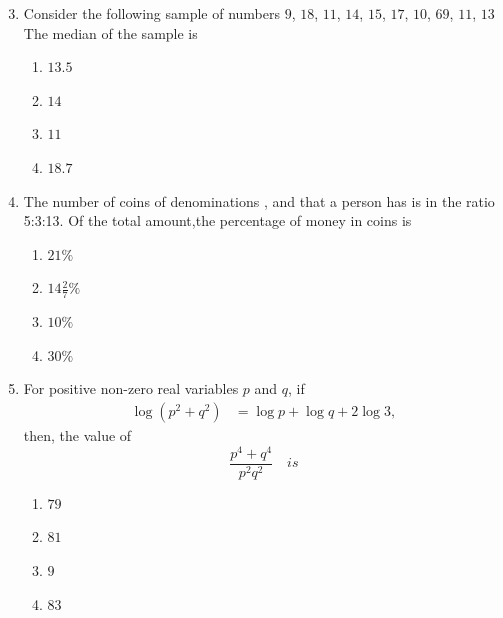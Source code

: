 \documentclass[journal]{IEEEtran}
\theoremstyle{remark}
\begin{document}
\begin{enumerate}[itemsep=1em]
\setcounter{enumi}{2}

\item Consider the following sample of numbers\:
    $9$, $18$, $11$, $14$, $15$, $17$, $10$, $69$, $11$, $13$
    The median of the sample is 
\begin{multicols}{4}
\begin{enumerate}
        \item $13.5$
        \item $14$
        \item $11$
        \item $18.7$\\
    \end{enumerate}
\end{multicols}
\end{enumerate}


 \begin{enumerate}[itemsep=1em]
\setcounter{enumi}{3}
\item The number of coins of denominations ,  and  that a person has is in the ratio 5:3:13. Of the total amount,the percentage of money in  coins is
\begin{multicols}{4}
\begin{enumerate}
        \item $21\%$
        \item $14\tfrac{2}{7}\%$
        \item $10\%$
        \item $30\%$\\
    \end{enumerate}
\end{multicols}
\end{enumerate}

\newpage
\vspace*{0.25cm}



\begin{enumerate}[itemsep=1em]
\setcounter{enumi}{4}
\item For positive non-zero real variables $p$ and $q$, if 
\begin{align*}
    \log \left( p^2 + q^2 \right) &= \log p + \log q + 2 \log 3,
\end{align*}
then, the value of 
\[
    \frac{p^4 + q^4}{p^2 q^2} \quad is
\]
\begin{multicols}{4}
\begin{enumerate}
        \item $79$
        \item $81$
        \item $9$
        \item $83$
    \end{enumerate}
\end{multicols}
\end{enumerate}
\vspace*{0.5cm}
\end{document}
